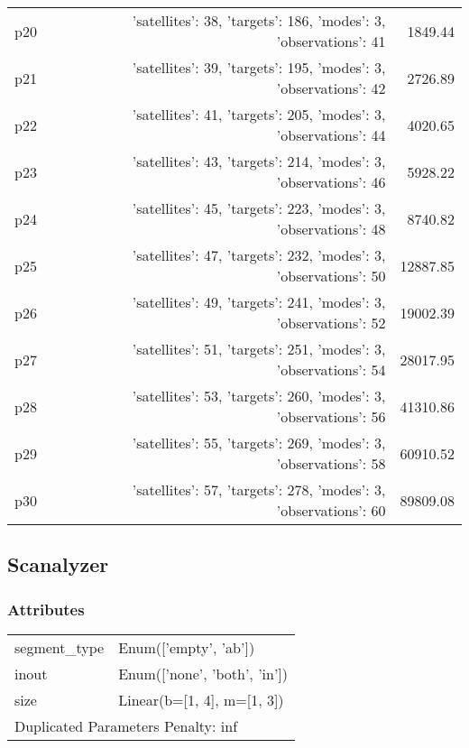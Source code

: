 \documentclass{article}
\begin{document}
\begin{center}
\begin{tabular}{@{}l|r|r@{}}
  p20&{'satellites': 38, 'targets': 186, 'modes': 3, 'observations': 41}&1849.44\\
  p21&{'satellites': 39, 'targets': 195, 'modes': 3, 'observations': 42}&2726.89\\
  p22&{'satellites': 41, 'targets': 205, 'modes': 3, 'observations': 44}&4020.65\\
  p23&{'satellites': 43, 'targets': 214, 'modes': 3, 'observations': 46}&5928.22\\
  p24&{'satellites': 45, 'targets': 223, 'modes': 3, 'observations': 48}&8740.82\\
  p25&{'satellites': 47, 'targets': 232, 'modes': 3, 'observations': 50}&12887.85\\
  p26&{'satellites': 49, 'targets': 241, 'modes': 3, 'observations': 52}&19002.39\\
  p27&{'satellites': 51, 'targets': 251, 'modes': 3, 'observations': 54}&28017.95\\
  p28&{'satellites': 53, 'targets': 260, 'modes': 3, 'observations': 56}&41310.86\\
  p29&{'satellites': 55, 'targets': 269, 'modes': 3, 'observations': 58}&60910.52\\
  p30&{'satellites': 57, 'targets': 278, 'modes': 3, 'observations': 60}&89809.08
                            \end{tabular}
                            \end{center}
                    
                            \newpage \subsection{Scanalyzer}
                    \subsubsection*{Attributes}
                    \begin{tabular}{@{}p{}p{}@{}}
                    \toprule
                    segment\_type & Enum(['empty', 'ab'])\\
inout & Enum(['none', 'both', 'in'])\\
size & Linear(b=[1, 4], m=[1, 3]) \\
                    \bottomrule
                    \multicolumn{2}{l}{Duplicated Parameters Penalty: inf}
                    \end{tabular}
                
\end{document}
